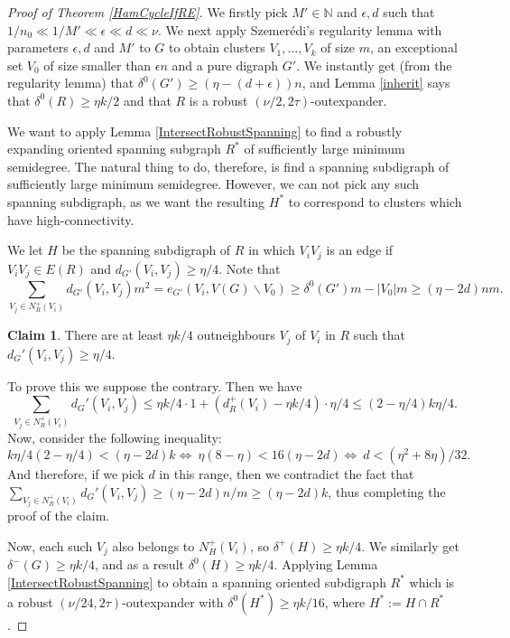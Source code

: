 \documentclass[10pt,letterpaper, reqno]{amsart}
\theoremstyle{definition}
\numberwithin{equation}{section}
\newtheorem{claim}{Claim}
\begin{document}
\begin{proof}[Proof of Theorem \ref{HamCycleIfRE}]
	We firstly pick $M' \in \mathbb{N}$ and $\epsilon,d$ such that $1/n_0 \ll 1/M' \ll \epsilon \ll d \ll \nu.$ We next apply Szemer\'{e}di's regularity lemma with parameters $\epsilon, d$ and $M'$ to $G$ to obtain clusters $V_1, \dots, V_k$ of size $m$, an exceptional set $V_0$ of size smaller than $\epsilon n$ and a pure digraph $G'$. We instantly get (from the regularity lemma) that $\delta^0(G') \geq (\eta-(d+\epsilon))n$, and Lemma \ref{inherit} says that $\delta^0(R)\geq \eta k /2$ and that $R$ is a robust $(\nu/2, 2\tau)$-outexpander.
	
	We want to apply Lemma \ref{IntersectRobustSpanning} to find a robustly expanding oriented spanning subgraph $R^*$ of sufficiently large minimum semidegree. The natural thing to do, therefore, is find a spanning subdigraph of sufficiently large minimum semidegree. However, we can not pick any such spanning subdigraph, as we want the resulting $H^*$ to correspond to clusters which have high-connectivity. 
	
	We let $H$ be the spanning subdigraph of $R$ in which $V_iV_j$ is an edge if $V_iV_j \in E(R)$ and $d_{G'}(V_i,V_j) \geq \eta/4$. Note that 
	$$ \sum_{V_j \in N^+_R(V_i)}d_{G'}(V_i,V_j)m^2  = e_{G'}(V_i,V(G)\backslash V_0) \geq \delta^0(G')m - |V_0|m \geq (\eta - 2d)nm.$$ 
	
	\begin{claim}
		There are at least $\eta k /4$ outneighbours $V_j$ of $V_i$ in $R$ such that $d_G'(V_i,V_j) \geq \eta /4$.
	\end{claim}
	\begin{adjustwidth}{2.5em}{0pt}
		To prove this we suppose the contrary. 
		Then we have 
		$$ \sum_{V_j \in N_R^+(V_i)} d_G'(V_i,V_j) \leq \eta k/4 \cdot 1 + (d_R^+(V_i)-\eta k /4) \cdot \eta /4 \leq (2-\eta/4)k\eta/4.$$ 
		Now, consider the following inequality:
		$$k\eta/4(2-\eta/4) < (\eta - 2d)k 
		\Leftrightarrow \  \eta(8-\eta) < 16(\eta-2d) 
		\Leftrightarrow \  d < (\eta^2 + 8\eta)/32.
		$$
		And therefore, if we pick $d$ in this range, then we contradict the fact that $ \sum_{V_j \in N_R^+(V_i)} d_G'(V_i,V_j) \geq (\eta - 2d)n/m \geq (\eta-2d)k$, thus completing the proof of the claim. 
	\end{adjustwidth}
	
	\noindent Now, each such $V_j$ also belongs to $N^+_H(V_i)$, so $\delta^+(H) \geq \eta k/4$. We similarly get $\delta^-(G)\geq \eta k/4$, and as a result $\delta^0(H)\geq \eta k/4$. Applying Lemma \ref{IntersectRobustSpanning} to obtain a spanning oriented subdigraph $R^*$ which is a robust $(\nu/24, 2\tau)$-outexpander with $\delta^0(H^*) \geq \eta k/16$, where $H^* := H \cap R^*$.
	

\end{proof}
\end{document}
